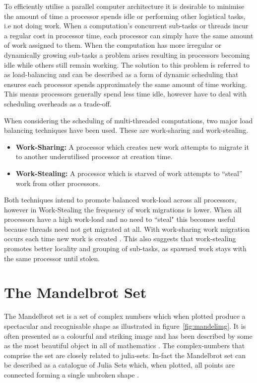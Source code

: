 To efficiently utilise a parallel computer architecture it is desirable to minimise
the amount of time a processor spends idle or performing other logistical tasks, i.e not doing work. 
When a computation's concurrent sub-tasks or \glspl{thread} incur a regular cost in processor
time, each processor can simply have the same amount of work assigned to them. When the computation has
more irregular or dynamically growing sub-tasks a problem arises resulting in 
processors becoming idle while others still remain working. The solution to this problem is referred to as
\gls{load-balancing} and can be described as a form of dynamic scheduling that ensures each processor 
spends approximately the same amount of time working. This means processors generally spend
less time idle, however have to deal with scheduling overheads as a trade-off.

When considering the scheduling of multi-threaded computations, two major load balancing techniques have been used.
These are \gls{work-sharing} and \gls{work-stealing}.

\begin{itemize}
\item \textbf{Work-Sharing:} A processor which creates new work attempts to migrate it to another underutilised processor at creation time. 
\item \textbf{Work-Stealing:} A processor which is starved of work attempts to ``steal'' work from other processors. 
\end{itemize}

Both techniques intend to promote balanced work-load across all processors, however in Work-Stealing
the frequency of work migrations is lower. When all processors have a 
high work-load and no need to ``steal" this becomes useful because threads need not get 
migrated at all. With \gls{work-sharing} work migration occurs each time new work is created \cite{blumleis}.
This also suggests that \gls{work-stealing} promotes better \gls{locality} and grouping of sub-tasks, as spawned work 
stays with the same processor until stolen.

\section{The Mandelbrot Set}

The Mandelbrot set is a set of complex numbers which when plotted produce a spectacular and recognisable shape as illustrated in figure~\ref{fig:mandelimg}.
It is often presented as a colourful and striking image and has been described by some as the most beautiful object in all of mathematics \cite[p.~234]{chaosfract}.
The \glspl{complex-number} that comprise the set are closely related to \glspl{julia-set}. 
In-fact the Mandelbrot set can be described as a catalogue of Julia Sets which, when plotted, all points are connected 
forming a single unbroken shape \cite[p.~177]{fractimg}.

